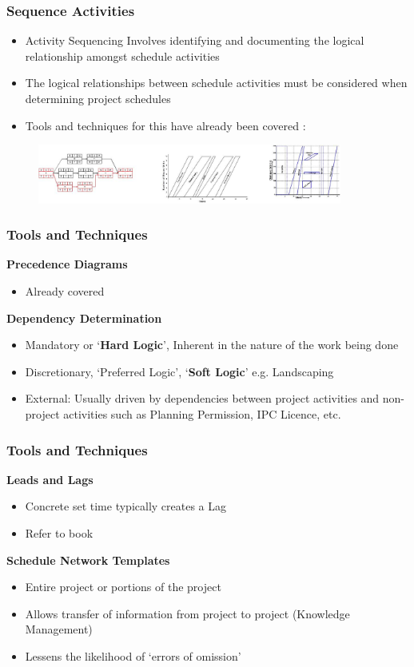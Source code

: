 \begin{frame}
\frametitle{Sequence Activities}
\begin{itemize}
	\item Activity Sequencing Involves identifying and documenting the logical relationship amongst schedule activities
	\item The logical relationships between schedule activities must be considered when determining project schedules
	\item Tools and techniques for this have already been covered :
\end{itemize}

\begin{figure}
	\centering
		\includegraphics[width = 10cm]{images/schtypes.jpg}
	\label{fig:schtypes}
\end{figure}

\end{frame}




\begin{frame}
\frametitle{Tools and Techniques}
\textbf{Precedence Diagrams}
\begin{itemize}
	\item Already covered
\end{itemize}
\textbf{Dependency Determination}
\begin{itemize}
	\item Mandatory	or ‘\textbf{Hard Logic}’, Inherent in the nature of the work being done
	\item Discretionary, ‘Preferred Logic’, ‘\textbf{Soft Logic}’ e.g. Landscaping
	\item External: Usually driven by dependencies between project activities and non-project activities such as Planning Permission, IPC Licence, etc.
\end{itemize}
\end{frame}




\begin{frame}
\frametitle{Tools and Techniques}
\textbf{Leads and Lags}
\begin{itemize}
	\item Concrete set time typically creates a Lag
	\item Refer to book 
\end{itemize}
\textbf{Schedule Network Templates}
\begin{itemize}
	\item Entire project or portions of the project
	\item Allows transfer of information from project to project (Knowledge Management)
	\item Lessens the likelihood of ‘errors of omission’
\end{itemize}
\end{frame}




